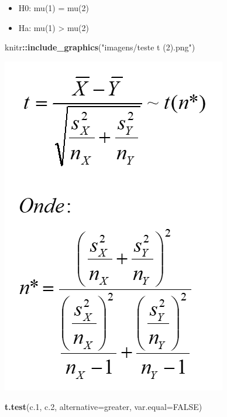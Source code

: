 \documentclass[
]{book}
\newenvironment{Shaded}{\begin{snugshade}}{\end{snugshade}}
\newcommand{\AttributeTok}[1]{\textcolor[rgb]{0.13,0.29,0.53}{#1}}
\newcommand{\ConstantTok}[1]{\textcolor[rgb]{0.56,0.35,0.01}{#1}}
\newcommand{\FloatTok}[1]{\textcolor[rgb]{0.00,0.00,0.81}{#1}}
\newcommand{\FunctionTok}[1]{\textcolor[rgb]{0.13,0.29,0.53}{\textbf{#1}}}
\newcommand{\NormalTok}[1]{#1}
\newcommand{\SpecialCharTok}[1]{\textcolor[rgb]{0.81,0.36,0.00}{\textbf{#1}}}
\newcommand{\StringTok}[1]{\textcolor[rgb]{0.31,0.60,0.02}{#1}}
\providecommand{\tightlist}{%
  \setlength{\itemsep}{0pt}\setlength{\parskip}{0pt}}
\begin{document}
\begin{itemize}
\tightlist
\item
  H0: mu(1) = mu(2)
\item
  Ha: mu(1) \textgreater{} mu(2)
\end{itemize}

\begin{Shaded}
\begin{Highlighting}[]
\NormalTok{knitr}\SpecialCharTok{::}\FunctionTok{include\_graphics}\NormalTok{(}\StringTok{"imagens/teste t (2).png"}\NormalTok{)}
\end{Highlighting}
\end{Shaded}

\includegraphics{imagens/teste t (2).png}

\begin{Shaded}
\begin{Highlighting}[]
\FunctionTok{t.test}\NormalTok{(c}\FloatTok{.1}\NormalTok{, c}\FloatTok{.2}\NormalTok{, }\AttributeTok{alternative=}\StringTok{\textquotesingle{}greater\textquotesingle{}}\NormalTok{, }\AttributeTok{var.equal=}\ConstantTok{FALSE}\NormalTok{)}
\end{Highlighting}
\end{Shaded}
\end{document}
